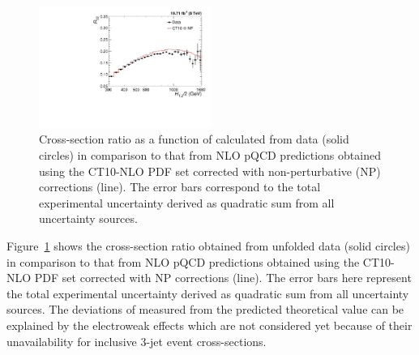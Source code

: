 \begin{figure}[!h]
 \begin{center}
 \includegraphics[width=0.50\textwidth]{Plots_HT_2_150/Sensitivity_ratio_32_CT10_only.pdf}%
 \caption[Cross-section ratio as a function of \httwo calculated from data in comparison to that from NLO pQCD predictions obtained using the CT10-NLO PDF set.]{Cross-section ratio \ratio as a function of \httwo calculated from data (solid circles) in comparison to that from NLO pQCD predictions obtained using the CT10-NLO PDF set corrected with non-perturbative (NP) corrections (line). The error bars correspond to the total experimental uncertainty derived as quadratic sum from all uncertainty sources.}
 \label{fig:ratiosens}
 \end{center}
\end{figure}

Figure~\ref{fig:ratiosens} shows the cross-section ratio \ratio obtained from unfolded data (solid circles) in comparison to that from NLO pQCD predictions obtained using the CT10-NLO PDF set corrected with NP corrections (line). The error bars here represent the total experimental uncertainty derived as quadratic sum from all uncertainty sources. The deviations of measured \ratio from the predicted theoretical value can be explained by the electroweak effects which are not considered yet because of their unavailability for inclusive 3-jet event cross-sections.

